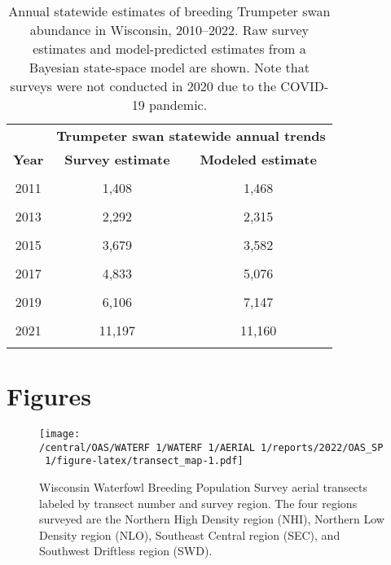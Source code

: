 \documentclass[
  12pt,
]{article}
\begin{document}
\newpage

\begin{table}[!h]

\caption{\label{tab:trump_tab}Annual statewide estimates of breeding Trumpeter swan abundance in Wisconsin, 2010--2022. Raw survey estimates and model-predicted estimates from a Bayesian state-space model are shown. Note that surveys were not conducted in 2020 due to the COVID-19 pandemic.}
\centering
\begin{tabular}[t]{ccc}
\toprule
\multicolumn{1}{c}{\textbf{ }} & \multicolumn{2}{c}{\textbf{Trumpeter swan statewide annual trends}} \\
\cmidrule(l{3pt}r{3pt}){2-3}
\textbf{Year} & \textbf{Survey estimate} & \textbf{Modeled estimate}\\
\midrule
\cellcolor{gray!6}{2010} & \cellcolor{gray!6}{1,237} & \cellcolor{gray!6}{1,203}\\
2011 & 1,408 & 1,468\\
\cellcolor{gray!6}{2012} & \cellcolor{gray!6}{1,999} & \cellcolor{gray!6}{1,883}\\
2013 & 2,292 & 2,315\\
\cellcolor{gray!6}{2014} & \cellcolor{gray!6}{2,979} & \cellcolor{gray!6}{2,906}\\
2015 & 3,679 & 3,582\\
\cellcolor{gray!6}{2016} & \cellcolor{gray!6}{5,029} & \cellcolor{gray!6}{4,469}\\
2017 & 4,833 & 5,076\\
\cellcolor{gray!6}{2018} & \cellcolor{gray!6}{5,677} & \cellcolor{gray!6}{6,019}\\
2019 & 6,106 & 7,147\\
\cellcolor{gray!6}{2020} & \cellcolor{gray!6}{} & \cellcolor{gray!6}{9,303}\\
2021 & 11,197 & 11,160\\
\cellcolor{gray!6}{2022} & \cellcolor{gray!6}{11,919} & \cellcolor{gray!6}{13,320}\\
\bottomrule
\end{tabular}
\end{table}

\newpage

\hypertarget{figures}{%
\section{Figures}\label{figures}}

\begin{figure}
\centering
\texttt{[image: /central/OAS/WATERF~1/WATERF~1/AERIAL~1/reports/2022/OAS\_SP~1/figure-latex/transect\_map-1.pdf]}
\caption{\label{fig:transect_map}Wisconsin Waterfowl Breeding Population
Survey aerial transects labeled by transect number and survey region.
The four regions surveyed are the Northern High Density region (NHI),
Northern Low Density region (NLO), Southeast Central region (SEC), and
Southwest Driftless region (SWD).}
\end{figure}
\end{document}
